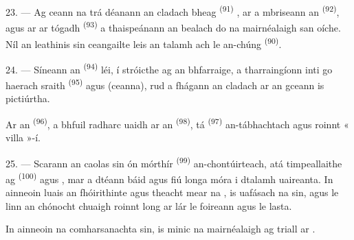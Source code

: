 23. --- Ag ceann na trá déanann an cladach  bheag
\textsuperscript{(91)} , ar a mbriseann an 
\textsuperscript{(92)}, agus ar ar tógadh  \textsuperscript{(93)}
a thaispeánann an bealach do na mairnéalaigh san oíche. Níl an leathinis sin
ceangailte leis an talamh ach le  an-chúng \textsuperscript{(90)}.

\VUsaut{3.0mm}
\VUsaut{3.0mm}

24. --- Síneann an  \textsuperscript{(94)} léi, í stróicthe ag an
bhfarraige, a tharraingíonn inti go haerach sraith 
\textsuperscript{(95)} agus  (ceanna), rud a fhágann an cladach ar an
gceann is pictiúrtha.

Ar an  \textsuperscript{(96)}, a bhfuil radharc uaidh ar an
 \textsuperscript{(98)}, tá  \textsuperscript{(97)}
an-tábhachtach agus roinnt « villa »-í.

25. --- Scarann an caolas sin ón mórthír  \textsuperscript{(99)}
an-chontúirteach, atá timpeallaithe ag  \textsuperscript{(100)}
agus , mar a dtéann báid agus fiú longa móra i dtalamh uaireanta.
In ainneoin luais an fhóirithinte agus theacht mear na , is
uafásach na  sin, agus le linn  an
chónocht chuaigh roinnt long ar lár le foireann agus le lasta.

In ainneoin na comharsanachta sin, is minic na mairnéalaigh ag triall ar
.
